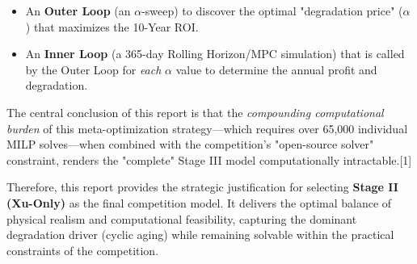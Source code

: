 \documentclass[11pt, a4paper]{article}
\begin{document}
\begin{itemize}
    \item An \textbf{Outer Loop} (an $\alpha$-sweep) to discover the optimal "degradation price" ($\alpha$) that maximizes the 10-Year ROI.
    \item An \textbf{Inner Loop} (a 365-day Rolling Horizon/MPC simulation) that is called by the Outer Loop for \textit{each} $\alpha$ value to determine the annual profit and degradation.
\end{itemize}

The central conclusion of this report is that the \textit{compounding computational burden} of this meta-optimization strategy—which requires over 65,000 individual MILP solves—when combined with the competition's "open-source solver" constraint, renders the "complete" Stage III model computationally intractable.[1]

Therefore, this report provides the strategic justification for selecting \textbf{Stage II (Xu-Only)} as the final competition model. It delivers the optimal balance of physical realism and computational feasibility, capturing the dominant degradation driver (cyclic aging) while remaining solvable within the practical constraints of the competition.
\end{document}
